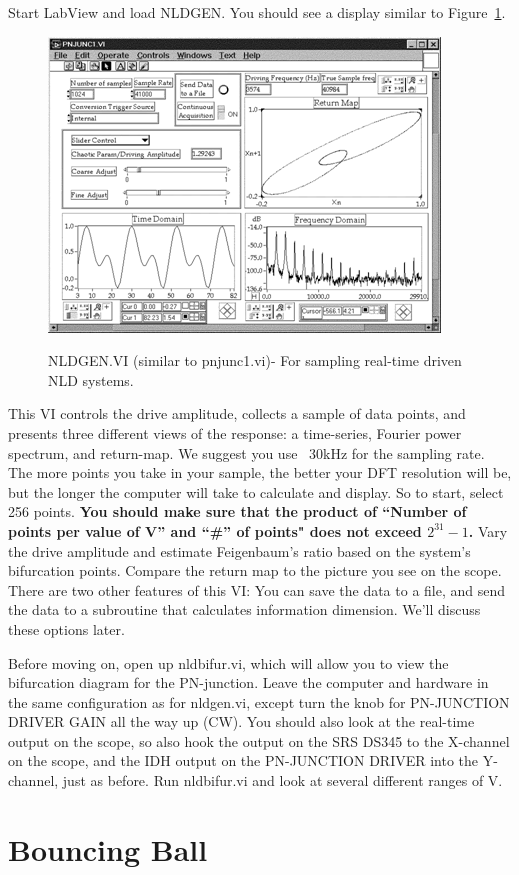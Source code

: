 \documentclass{../lab}
\begin{document}
Start LabView and load NLDGEN. You should see a display similar to Figure~\ref{fig:NLDGENVI}.

\begin{figure}[h]
    \centering
    \href{http://experimentationlab.berkeley.edu/sites/default/files/images/Nldimage128.gif}{\includegraphics[width=0.5\linewidth]{images/Nldimage128.png}}
    \caption{NLDGEN.VI (similar to pnjunc1.vi)- For sampling real-time driven NLD systems.}
    \label{fig:NLDGENVI}
\end{figure}

This VI controls the drive amplitude, collects a sample of data points, and presents three different views of the response: a time-series, Fourier power spectrum, and return-map. We suggest you use ~30kHz for the sampling rate. The more points you take in your sample, the better your DFT resolution will be, but the longer the computer will take to calculate and display. So to start, select 256 points. \textbf{You should make sure that the product of ``Number of points per value of V'' and ``\#'' of points" does not exceed $2^{31} - 1$.}  Vary the drive amplitude and estimate Feigenbaum's ratio based on the system's bifurcation points. Compare the return map to the picture you see on the scope. There are two other features of this VI: You can save the data to a file, and send the data to a subroutine that calculates information dimension. We'll discuss these options later.

Before moving on, open up nldbifur.vi, which will allow you to view the bifurcation diagram for the PN-junction. Leave the computer and hardware in the same configuration as for nldgen.vi, except turn the knob for PN-JUNCTION DRIVER GAIN all the way up (CW). You should also look at the real-time output on the scope, so also hook the output on the SRS DS345 to the X-channel on the scope, and the IDH output on the PN-JUNCTION DRIVER into the Y-channel, just as before. Run nldbifur.vi and look at several different ranges of V.

\section{Bouncing Ball}
\end{document}
